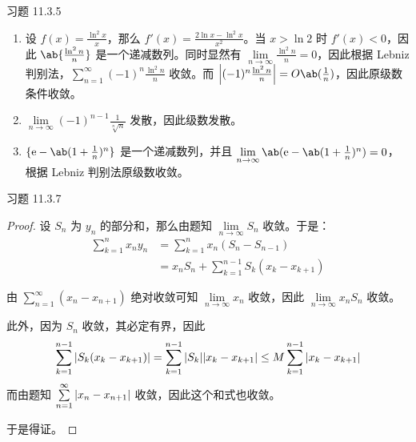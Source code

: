 \begin{problem}
    习题 11.3.5
    \begin{solution}
        \begin{enumerate}
            \item[\textbf{2)}] 设 $f(x) = \frac{\ln^2 x}{x}$，那么 $f'(x) = \frac{2 \ln x - \ln^2 x}{x^2}$。当 $x > \ln 2$ 时 $f'(x) < 0$，因此 $\ab\{\frac{\ln^2 n}{n}\}$ 是一个递减数列。同时显然有 $\lim\limits_{n \to \infty} \frac{\ln^2 n}{n} = 0$，因此根据 Lebniz 判别法，$\sum\limits_{n = 1}^{\infty} (-1)^{n} \frac{\ln^2 n}{n}$ 收敛。而 $\abs{(-1)^{n} \frac{\ln^2 n}{n}} = O\ab(\frac{1}{n})$，因此原级数条件收敛。

            \item[\textbf{4)}] $\lim\limits_{n \to \infty} (-1)^{n - 1} \frac{1}{\sqrt[n]{n}}$ 发散，因此级数发散。
            
            \item[\textbf{6)}] $\{\E - \ab(1 + \frac{1}{n})^{n}\}$ 是一个递减数列，并且 $\lim\limits_{n \to \infty} \ab(\E - \ab(1 + \frac{1}{n})^{n}) = 0$，根据 Lebniz 判别法原级数收敛。
        \end{enumerate}
    \end{solution}
\end{problem}

\begin{problem}
    习题 11.3.7
    \begin{proof}
        设 $S_n$ 为 $y_n$ 的部分和，那么由题知 $\lim\limits_{n \to \infty} S_n$ 收敛。于是：
        $$
        \begin{aligned}
            \sum_{k = 1}^{n} x_n y_n & = \sum_{k = 1}^{n} x_n (S_n - S_{n - 1}) \\
            & = x_n S_n + \sum_{k = 1}^{n - 1} S_{k} (x_k - x_{k + 1})
        \end{aligned}
        $$

        由 $\sum\limits_{n = 1}^{\infty} (x_n - x_{n + 1})$ 绝对收敛可知 $\lim\limits_{n \to \infty} x_n$ 收敛，因此 $\lim\limits_{n \to \infty} x_n S_n$ 收敛。

        此外，因为 $S_n$ 收敛，其必定有界，因此
        $$
        \sum_{k = 1}^{n - 1} \abs{S_{k} (x_k - x_{k + 1})} = \sum_{k = 1}^{n - 1} \abs{S_{k}} \abs{x_k - x_{k + 1}} \le M \sum_{k = 1}^{n - 1} \abs{x_k - x_{k + 1}}
        $$
        而由题知 $\sum\limits_{n = 1}^{\infty} \abs{x_n - x_{n + 1}}$ 收敛，因此这个和式也收敛。

        于是得证。
    \end{proof}
\end{problem}

